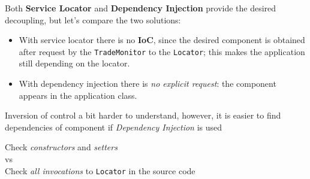 Both \textbf{Service Locator} and \textbf{Dependency Injection} provide
the desired decoupling, but let's compare the two solutions: 
\begin{itemize}
   \item 
   With service locator there is no \textbf{IoC}, since the desired component is obtained
   after request by the \texttt{TradeMonitor} to the \texttt{Locator};
   this makes the application still depending on the locator.
   \item With dependency injection there is \textit{no explicit request}: the
   component appears in the application class.
\end{itemize}
Inversion of control a bit harder to understand, however,
it is easier to find dependencies of component if \textit{Dependency Injection} is used
\begin{center}
   \color{darkgray}
   Check \textit{constructors} and \textit{setters}\\vs\\Check \textit{all invocations} to
   \texttt{Locator} in the source code
\end{center}